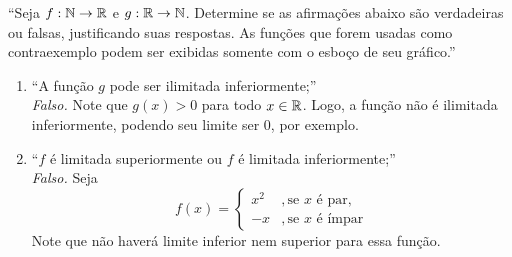 \enquote{Seja $f : \mathbb N \rightarrow \mathbb R$ e $g : \mathbb R \rightarrow \mathbb N$. Determine se as afirmações
abaixo são verdadeiras ou falsas, justificando suas respostas.
As funções que forem usadas como contraexemplo podem ser
exibidas somente com o esboço de seu gráfico.}
\begin{enumerate}
    \item \enquote{A função $g$ pode ser ilimitada inferiormente;} \\
    \emph{Falso.} Note que $g(x) > 0$ para todo $x \in \mathbb R$. Logo, a função não é ilimitada inferiormente, podendo seu limite ser 0, por exemplo.
    \item \enquote{$f$ é limitada superiormente ou $f$ é limitada inferiormente;} \\
    \emph{Falso.} Seja
    \begin{displaymath}
        f(x) = \left\{
            \begin{aligned}
                x^2 &, \text{se $x$ é par}, \\
                -x &, \text{se $x$ é ímpar}
            \end{aligned}
         \right.
    \end{displaymath}
    Note que não haverá limite inferior nem superior para essa função.
\end{enumerate}